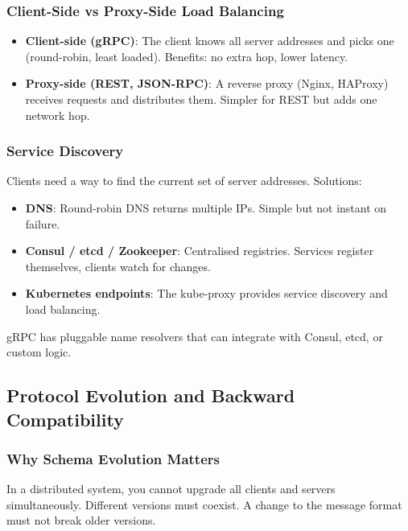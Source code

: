 \documentclass[10pt,a4paper]{article}
\begin{document}
\subsubsection{Client-Side vs Proxy-Side Load Balancing}
\begin{itemize}
    \item \textbf{Client-side (gRPC)}: The client knows all server addresses and picks one (round-robin, least loaded). Benefits: no extra hop, lower latency.
    \item \textbf{Proxy-side (REST, JSON-RPC)}: A reverse proxy (Nginx, HAProxy) receives requests and distributes them. Simpler for REST but adds one network hop.
\end{itemize}

\subsubsection{Service Discovery}
Clients need a way to find the current set of server addresses. Solutions:
\begin{itemize}
    \item \textbf{DNS}: Round-robin DNS returns multiple IPs. Simple but not instant on failure.
    \item \textbf{Consul / etcd / Zookeeper}: Centralised registries. Services register themselves, clients watch for changes.
    \item \textbf{Kubernetes endpoints}: The kube-proxy provides service discovery and load balancing.
\end{itemize}
gRPC has pluggable name resolvers that can integrate with Consul, etcd, or custom logic.

\subsection{Protocol Evolution and Backward Compatibility}

\subsubsection{Why Schema Evolution Matters}
In a distributed system, you cannot upgrade all clients and servers simultaneously. Different versions must coexist. A change to the message format must not break older versions.
\end{document}
